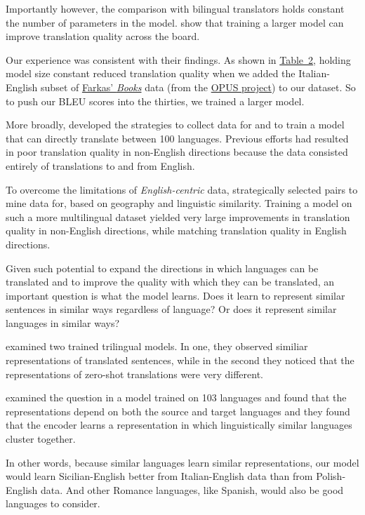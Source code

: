 \documentclass[10pt,letterpaper]{article}
\begin{document}
Importantly however, the comparison with bilingual translators holds constant the number of parameters in the model.
\citet{arivazhagan2019massively} show that training a larger model can improve translation quality across the board.

Our experience was consistent with their findings.
As shown in \hyperlink{bleuscores}{Table~2}, holding model size constant reduced translation quality when we added 
the Italian-English subset of
\href{https://farkastranslations.com/bilingual_books.php}{Farkas' \textit{Books}} data
(from the \href{https://opus.nlpl.eu/}{OPUS project}) to our dataset.
So to push our BLEU scores into the thirties, we trained a larger model.

More broadly, \citet{fan2020beyond} developed the strategies to collect data for and
to train a model that can directly translate between 100 languages.
Previous efforts had resulted in poor translation quality in
non-English directions because the data consisted entirely of translations to and from English.

To overcome the limitations of \textit{English-centric} data, \citeauthor{fan2020beyond}
strategically selected pairs to mine data for, based on geography and linguistic similarity.
Training a model on such a more multilingual dataset yielded very large improvements in translation
quality in non-English directions, while matching translation quality in English directions.
      
Given such potential to expand the directions in which languages can be translated and to improve 
the quality with which they can be translated, an important question is what the model learns.    
Does it learn to represent similar sentences in similar ways regardless of language?
Or does it represent similar languages in similar ways?

\citeauthor{johnson2017zeroshot} examined two trained trilingual models.
In one, they observed similiar representations of translated sentences,
while in the second they noticed that the representations of zero-shot translations were very different.
      
\citet{kudugunta2019investigating} examined the question in a model trained on 103 languages
and found that the representations depend on both the source and target languages
and they found that the encoder learns a representation in which 
linguistically similar languages cluster together.

In other words, because similar languages learn similar representations, our model would learn Sicilian-English 
better from Italian-English data than from Polish-English data.  And other Romance languages, like Spanish, would 
also be good languages to consider.
\end{document}
